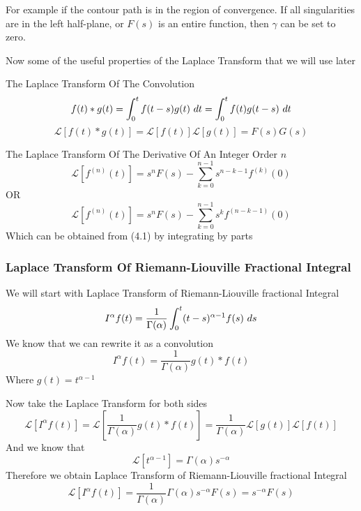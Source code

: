 For example if the contour path is in the region of convergence. If all singularities are in the left half-plane, or 
$F(s)$ is an entire function, then $\gamma$ can be set to zero.

Now some of the useful properties of the Laplace Transform that we will use later 
\setcounter{property}{0}
\begin{property}
    The Laplace Transform Of The Convolution 
    \[
    f(t)*g(t) = \int_{0}^{t} f(t-s)g(t) \,\, dt = \int_{0}^{t} f(t)g(t-s) \,\, dt
    \]
    \begin{equation}
        \mathcal{L}\left[ f(t)*g(t) \right] = \mathcal{L}\left[ f(t) \right]\mathcal{L}\left[ g(t) \right] = F(s)G(s)
    \end{equation}
\end{property}
\begin{property}
The Laplace Transform Of The Derivative Of An Integer Order $n$
\begin{equation}
    \mathcal{L}\left[ f^{(n)}(t) \right] = s^n F(s) - \sum_{k=0}^{n-1} s^{n-k-1} f^{(k)}(0)
\end{equation}
OR
\begin{equation}
    \mathcal{L}\left[ f^{(n)}(t) \right] = s^n F(s) - \sum_{k=0}^{n-1} s^k f^{(n-k-1)}(0)
\end{equation}
Which can be obtained from (4.1) by integrating by parts 
\end{property}
\subsubsection{Laplace Transform Of Riemann-Liouville Fractional Integral}
We will start with Laplace Transform of Riemann-Liouville fractional Integral
\[
    I^\alpha f(t) = \frac{1}{\Gamma(\alpha)}\int_{0}^{t} (t-s)^{\alpha-1}f(s) \,\, ds
\]
We know that we can rewrite it as a convolution
\[
    I^\alpha f(t) = \frac{1}{\Gamma(\alpha)} g(t)*f(t)
\]
Where $\displaystyle g(t) = t^{\alpha-1}$

Now take the Laplace Transform for both sides
\[
    \mathcal{L}\left[ I^\alpha f(t) \right] = \mathcal{L}\left[ \frac{1}{\Gamma(\alpha)} g(t)*f(t) \right] = \frac{1}{\Gamma(\alpha)} \mathcal{L}\left[ g(t) \right]\mathcal{L}\left[ f(t) \right]
\]
And we know that 
\[
    \mathcal{L}\left[ t^{\alpha-1} \right] = \Gamma(\alpha)s^{-\alpha}
\]
Therefore we obtain Laplace Transform of Riemann-Liouville fractional Integral
\begin{equation}
    \mathcal{L}\left[ I^\alpha f(t) \right] = \frac{1}{\Gamma(\alpha)} \Gamma(\alpha)s^{-\alpha}F(s) = s^{-\alpha}F(s)
\end{equation}
